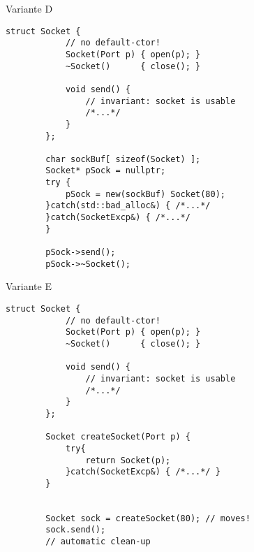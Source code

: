 \begin{frame}[t, fragile]{ Variante D }
	\begin{lstlisting}[basicstyle=\scriptsize]
		struct Socket {
		    // no default-ctor!
		    Socket(Port p) { open(p); }
		    ~Socket()      { close(); }
			
		    void send() {
		        // invariant: socket is usable
		        /*...*/
		    }
		};
		
		char sockBuf[ sizeof(Socket) ];
		Socket* pSock = nullptr;
		try {
		    pSock = new(sockBuf) Socket(80);
		}catch(std::bad_alloc&) { /*...*/
		}catch(SocketExcp&) { /*...*/
		}
		
		pSock->send();
		pSock->~Socket();
	\end{lstlisting}
\end{frame}

\begin{frame}[t, fragile]{ Variante E }
	\begin{lstlisting}[basicstyle=\scriptsize]
		struct Socket {
		    // no default-ctor!
		    Socket(Port p) { open(p); }
		    ~Socket()      { close(); }
			
		    void send() {
		        // invariant: socket is usable
		        /*...*/
		    }
		};
		
		Socket createSocket(Port p) {
		    try{
		        return Socket(p);
		    }catch(SocketExcp&) { /*...*/ }
		}
		
		
		Socket sock = createSocket(80);	// moves!
		sock.send();
		// automatic clean-up
	\end{lstlisting}
\end{frame}

